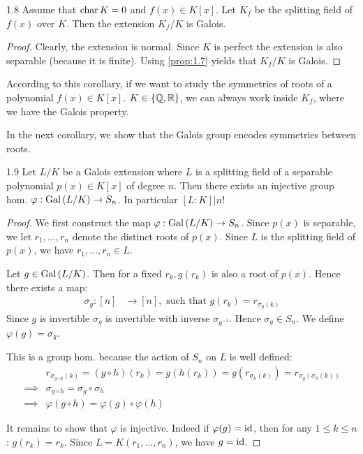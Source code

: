 \documentclass[twoside = false,	%
		headsepline,		%
		parskip = true,
		]{scrbook}						%
\begin{document}
        \begin{corollary}{}{1.8}
            Assume that $\mathrm{char} \, K = 0$ and $f(x) \in K[x]$. Let $K_f$ be the splitting field of $f(x)$ over $K$. Then the extension $K_f/K$ is Galois.
        \end{corollary}
        \begin{proof}
            Clearly, the extension is normal. Since $K$ is perfect the extension is also separable (because it is finite). Using \ref{prop:1.7} yields that $K_f/K$ is Galois.
        \end{proof}
        
        According to this corollary, if we want to study the symmetries of roots of a polynomial $f(x) \in K[x]$. $K \in \{\mathbb Q,\mathbb R\}$, we can always work inside $K_f$, where we have the Galois property.
        
        In the next corollary, we show that the Galois group encodes symmetries between roots.
        
        \begin{corollary}{}{1.9}
            Let $L/K$ be a Galois extension where $L$ is a splitting field of a separable polynomial $p(x) \in K[x]$ of degree $n$. Then there exists an injective group hom. $\varphi: \mathrm{Gal}\left( L/K\right) \rightarrow S_n$. In particular $[L:K]|n!$
        \end{corollary}
        
        \begin{proof}
            We first construct the map $\varphi: \mathrm{Gal}\left( L/K\right) \rightarrow S_n$. Since $p(x)$ is separable, we let $r_1,\dots,r_n$ denote the distinct roots of $p(x)$. Since $L$ is the splitting field of $p(x)$, we have $r_1,\dots,r_n \in L$.
            
            Let $g \in \mathrm{Gal}\left( L/K\right)$. Then for a fixed $r_k, g(r_k)$ is also a root of $p(x)$. Hence there exists a map:
            \begin{align*}
                \sigma_g: [n] &\rightarrow [n], \text{ such that } g(r_k) = r_{\sigma_g(k)}
            \end{align*}
            Since $g$ is invertible $\sigma_g$ is invertible with inverse $\sigma_{g^{-1}}$. Hence $\sigma_g \in S_n$. We define $\varphi(g) = \sigma_g$.
            
            This is a group hom. because the action of $S_n$ on $L$ is well defined:
            \begin{align*}
                &r_{\sigma_{g \circ h}(k)} = (g \circ h)(r_k) = g(h(r_k)) = g(r_{\sigma_h(k)}) = r_{\sigma_g(\sigma_h(k))} \\
                \implies &\sigma_{g \circ h} = \sigma_g \circ \sigma_h \\
                \implies &\varphi(g \circ h) = \varphi(g) \circ \varphi(h)
            \end{align*}
            
            It remains to show that $\varphi$ is injective. Indeed if $\varphi(g) =\mathrm{id}$, then for any $1 \leq k \leq n$: $g(r_k) = r_k$. Since $L = K(r_1, \dots, r_n)$, we have $g = \mathrm{id}$.
        \end{proof}
        
\end{document}
